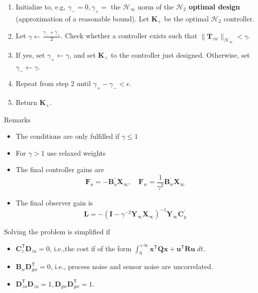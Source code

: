 \begin{enumerate}
    \item Initialize to, e.g, $\gamma_-=0,\gamma_+=$ the $\mathcal{H}_\infty$ norm of the \textbf{$\mathcal{H}_2$ optimal design} (approximation of a reasonable bound). Let $\mathbf{K}_+$ be the optimal $\mathcal{H}_2$ controller.
    \item Let $\gamma\gets \frac{\gamma_-+\gamma_+}{2}$. Check whether a controller exists such that $\|\mathbf{T}_{zw}\|_{\mathcal{H}_\infty}<\gamma$.
    \item If yes, set $\gamma_+\leftarrow\gamma$, and set $\mathbf{K}_+$ to the controller just designed. Otherwise, set $\gamma_-\leftarrow\gamma$.
    \item Repeat from step 2 until $\gamma_+-\gamma_-<\epsilon$.
    \item Return $\mathbf{K}_+$.
\end{enumerate}
\newpar{}
Remarks
\begin{itemize}
    \item The conditions are only fulfilled if $\gamma\le 1$
    \item For $\gamma>1$ use relaxed weights
    \item The final controller gains are 
    \begin{equation*}
        \mathbf{F}_u=-\mathbf{B}_u^{\prime}\mathbf{X}_\infty,\quad \mathbf{F}_w=\frac1{\gamma^2}\mathbf{B}_w^{\prime}\mathbf{X}_\infty 
    \end{equation*}
    \item The final observer gain is 
    \begin{equation*}
        \mathbf{L}=-{(\mathbf{I}-\gamma^{-2}\mathbf{Y}_\infty \mathbf{X}_\infty)}^{-1}\mathbf{Y}_\infty \mathbf{C}_y^{\prime}
    \end{equation*}
\end{itemize}

\newpar{}

Solving the problem is simplified if
\begin{itemize}
    \item $\mathbf{C}_{z}^{\mathsf{T}}\mathbf{D}_{zu}=0$, i.e.,the cost if of the form $\int_0^{+\infty}\mathbf{x}^{\mathsf{T}}\mathbf{Q}\mathbf{x}+\mathbf{u}^{\mathsf{T}}\mathbf{R}\mathbf{u}\;dt$.
    \item $\mathbf{B}_w \mathbf{D}_{yw}^{\mathsf{T}}=0$, i.e., process noise and sensor noise are uncorrelated.
    \item $\mathbf{D}_{zu}^{\mathsf{T}}\mathbf{D}_{zu}=1,\mathbf{D}_{yw}\mathbf{D}_{yw}^{\mathsf{T}}=1$.
\end{itemize}

